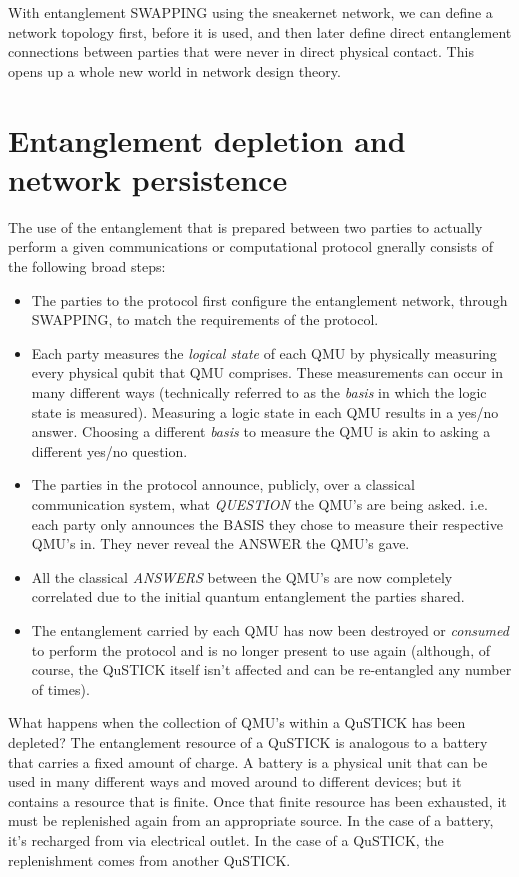 \documentclass[aps,prl,twocolumn,10pt,nofootinbib]{revtex4}
\begin{document}
\\
\\
With entanglement SWAPPING using the sneakernet network, we can define a network topology first, before it is used, and then later define direct entanglement connections between parties that were never in direct physical contact.  This opens up a whole new world in network design theory.  

\section{Entanglement depletion and network persistence}
The use of the entanglement that is prepared between two parties to actually perform a given communications or computational protocol gnerally consists of the following broad steps: 
\begin{itemize}
\item The parties to the protocol first configure the entanglement network, through SWAPPING, to match the requirements of the protocol.
\item Each party measures the {\em logical state} of each QMU by physically measuring every physical qubit that QMU comprises.  These measurements can occur in many different ways (technically referred to as the {\em basis} in which the logic state is measured).  Measuring a logic state in each QMU results in a yes/no answer.  Choosing a different {\em basis} to measure the QMU is akin to asking a different yes/no question. 
\item The parties in the protocol announce, publicly, over a classical communication system, what {\em QUESTION} the QMU's are being asked.  i.e. each party only announces the BASIS they chose to measure their respective QMU's in.  They never reveal the ANSWER the QMU's gave.  
\item All the classical {\em ANSWERS} between the QMU's are now completely correlated due to the initial quantum entanglement the parties shared.  
\item The entanglement carried by each QMU has now been destroyed or {\em consumed} to perform the protocol and is no longer present to use again (although, of course, the QuSTICK itself isn't affected and can be re-entangled any number of times). 
\end{itemize}
What happens when the collection of QMU's within a QuSTICK has been depleted?  The entanglement resource of a QuSTICK is analogous to a battery that carries a fixed amount of charge.  A battery is a physical unit that can be used in many different ways and moved around to different devices; but it contains a resource that is finite.  Once that finite resource has been exhausted, it must be replenished again from an appropriate source.  In the case of a battery, it's recharged from via electrical outlet.  In the case of a QuSTICK, the replenishment comes from another QuSTICK.
\end{document}
